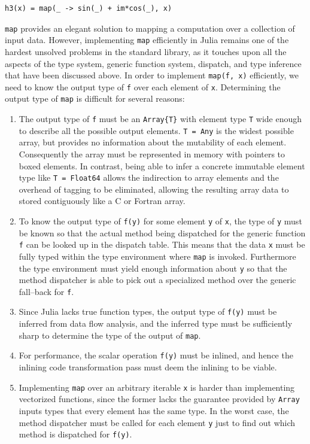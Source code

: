 \documentclass[pldi]{sigplanconf-pldi15}
\begin{document}
\begin{lstlisting}
h3(x) = map(_ -> sin(_) + im*cos(_), x)
\end{lstlisting}

\verb|map| provides an elegant solution to mapping a computation over a
collection of input data. However, implementing \verb|map| efficiently in Julia
remains one of the hardest unsolved problems in the standard library, as it
touches upon all the aspects of the type system, generic function system,
dispatch, and type inference that have been discussed above. In order to
implement \verb|map(f, x)| efficiently, we need to know the output type of
\verb|f| over each element of \verb|x|. Determining the output type of
\verb|map| is difficult for several reasons:

\begin{enumerate}

	\item The output type of \verb|f| must be an \verb|Array{T}| with
	element type \verb|T| wide enough to describe all the possible output
	elements. \verb|T = Any| is the widest possible array, but provides no
	information about the mutability of each element. Consequently the
	array must be represented in memory with pointers to boxed elements. In
	contrast, being able to infer a concrete immutable element type like
	\verb|T = Float64| allows the indirection to array elements and the
	overhead of tagging to be eliminated, allowing the resulting array data
	to stored contiguously like a C or Fortran array.

	\item To know the output type of \verb|f(y)| for some element \verb|y|
	of \verb|x|, the type of \verb|y| must be known so that the actual
	method being dispatched for the generic function \verb|f| can be looked
	up in the dispatch table. This means that the data \verb|x| must be
	fully typed within the type environment where \verb|map| is invoked.
	Furthermore the type environment must yield enough information about
	\verb|y| so that the method dispatcher is able to pick out a
	specialized method over the generic fall--back for \verb|f|.

	\item Since Julia lacks true function types, the output type of
	\verb|f(y)| must be inferred from data flow analysis, and the inferred
	type must be sufficiently sharp to determine the type of the output of
	\verb|map|.

	\item For performance, the scalar operation \verb|f(y)| must be
	inlined, and hence the inlining code transformation pass must deem the
	inlining to be viable.

	\item Implementing \verb|map| over an arbitrary iterable \verb|x| is
	harder than implementing vectorized functions, since the former lacks
	the guarantee provided by \verb|Array| inputs types that every element
	has the same type. In the worst case, the method dispatcher must be
	called for each element \verb|y| just to find out which method is
	dispatched for \verb|f(y)|.

\end{enumerate}
\end{document}

